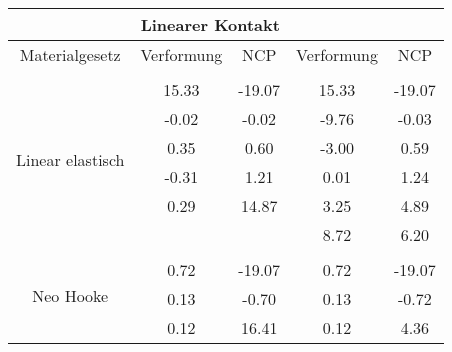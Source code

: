 \begin{table} 
\centering 
\begin{tabular}{c|cc|cc|} 
\cline{2-5} 
 & \multicolumn{2}{|c|}{Linearer Kontakt} &  \\ 
\hline 
\multicolumn{1}{|c|}{Materialgesetz} & \multicolumn{1}{c|}{Verformung} & \multicolumn{1}{c|}{NCP} & \multicolumn{1}{c|}{Verformung} & \multicolumn{1}{c|}{NCP} \\ 
\hline 
\multicolumn{1}{|c|}{\multirow{7}{*}{Linear elastisch}} &\multicolumn{1}{|c|}{} & \multicolumn{1}{|c|}{} & \multicolumn{1}{|c|}{} & \multicolumn{1}{|c|}{} \\ 
\multicolumn{1}{|c|}{} & \multicolumn{1}{|c|}{     15.33} & \multicolumn{1}{|c|}{    -19.07} & \multicolumn{1}{|c|}{     15.33} & \multicolumn{1}{|c|}{    -19.07} \\ 
\multicolumn{1}{|c|}{} & \multicolumn{1}{|c|}{     -0.02} & \multicolumn{1}{|c|}{     -0.02} & \multicolumn{1}{|c|}{     -9.76} & \multicolumn{1}{|c|}{     -0.03} \\ 
\multicolumn{1}{|c|}{} & \multicolumn{1}{|c|}{      0.35} & \multicolumn{1}{|c|}{      0.60} & \multicolumn{1}{|c|}{     -3.00} & \multicolumn{1}{|c|}{      0.59} \\ 
\multicolumn{1}{|c|}{} & \multicolumn{1}{|c|}{     -0.31} & \multicolumn{1}{|c|}{      1.21} & \multicolumn{1}{|c|}{      0.01} & \multicolumn{1}{|c|}{      1.24} \\ 
\multicolumn{1}{|c|}{} & \multicolumn{1}{|c|}{      0.29} & \multicolumn{1}{|c|}{     14.87} & \multicolumn{1}{|c|}{      3.25} & \multicolumn{1}{|c|}{      4.89} \\ 
\multicolumn{1}{|c|}{} & \multicolumn{1}{|c|}{} & \multicolumn{1}{|c|}{} & \multicolumn{1}{|c|}{      8.72} & \multicolumn{1}{|c|}{      6.20} \\ 
\hline 
\multicolumn{1}{|c|}{\multirow{7}{*}{Neo Hooke}} &\multicolumn{1}{|c|}{} & \multicolumn{1}{|c|}{} & \multicolumn{1}{|c|}{} & \multicolumn{1}{|c|}{} \\ 
\multicolumn{1}{|c|}{} & \multicolumn{1}{|c|}{      0.72} & \multicolumn{1}{|c|}{    -19.07} & \multicolumn{1}{|c|}{      0.72} & \multicolumn{1}{|c|}{    -19.07} \\ 
\multicolumn{1}{|c|}{} & \multicolumn{1}{|c|}{      0.13} & \multicolumn{1}{|c|}{     -0.70} & \multicolumn{1}{|c|}{      0.13} & \multicolumn{1}{|c|}{     -0.72} \\ 
\multicolumn{1}{|c|}{} & \multicolumn{1}{|c|}{      0.12} & \multicolumn{1}{|c|}{     16.41} & \multicolumn{1}{|c|}{      0.12} & \multicolumn{1}{|c|}{      4.36} \\ 

\end{tabular}
\end{table}
